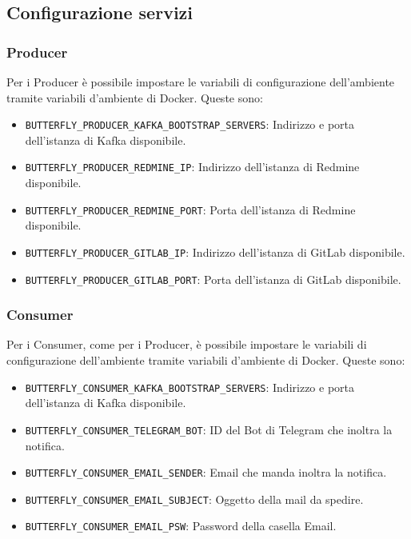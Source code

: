 \subsection{Configurazione servizi \progetto}\label{var}
	
	\subsubsection{Producer}
	Per i Producer è possibile impostare le variabili di configurazione dell'ambiente tramite variabili d'ambiente di Docker. Queste sono: 
	\begin{itemize}
		\item\texttt{BUTTERFLY\_PRODUCER\_KAFKA\_BOOTSTRAP\_SERVERS}: Indirizzo e porta dell'istanza di Kafka disponibile.
		\item\texttt{BUTTERFLY\_PRODUCER\_REDMINE\_IP}: Indirizzo dell'istanza di Redmine disponibile.
		\item\texttt{BUTTERFLY\_PRODUCER\_REDMINE\_PORT}: Porta dell'istanza di Redmine disponibile.
		\item\texttt{BUTTERFLY\_PRODUCER\_GITLAB\_IP}: Indirizzo dell'istanza di GitLab disponibile.
		\item\texttt{BUTTERFLY\_PRODUCER\_GITLAB\_PORT}: Porta dell'istanza di GitLab disponibile.
	\end{itemize}

	\subsubsection{Consumer}\label{var_consumer}
	Per i Consumer, come per i Producer, è possibile impostare le variabili di configurazione dell'ambiente tramite variabili d'ambiente di Docker. 
	Queste sono: 
	\begin{itemize}
		\item\texttt{BUTTERFLY\_CONSUMER\_KAFKA\_BOOTSTRAP\_SERVERS}: Indirizzo e porta dell'istanza di Kafka disponibile.
		\item\texttt{BUTTERFLY\_CONSUMER\_TELEGRAM\_BOT}: ID del Bot di Telegram che inoltra la notifica.
		\item\texttt{BUTTERFLY\_CONSUMER\_EMAIL\_SENDER}: Email che manda inoltra la notifica.
		\item\texttt{BUTTERFLY\_CONSUMER\_EMAIL\_SUBJECT}: Oggetto della mail da spedire.
		\item\texttt{BUTTERFLY\_CONSUMER\_EMAIL\_PSW}: Password della casella Email.
	\end{itemize}

